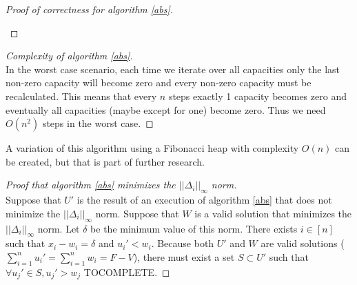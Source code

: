 \documentclass[11pt]{article}
\theoremstyle{definition}
\theoremstyle{corollary}
\theoremstyle{lemma}
\begin{document}
\begin{proof}[Proof of correctness for algorithm \ref{abs}]
\begin{itemize}
\begin{itemize}
          \end{itemize}
       \end{itemize}
    \end{proof}
    \begin{proof}[Complexity of algorithm \ref{abs}] \ \\
       In the worst case scenario, each time we iterate over all capacities only the last non-zero capacity will become zero
       and every non-zero capacity must be recalculated. This means that every $n$ steps exactly 1 capacity becomes zero
       and eventually all capacities (maybe except for one) become zero. Thus we need $O(n^2)$ steps in the worst case.
    \end{proof}
    A variation of this algorithm using a Fibonacci heap with complexity $O(n)$ can be created, but that is part of 
    further research.
    \begin{proof}[Proof that algorithm \ref{abs} minimizes the $||\Delta_i||_\infty$ norm] \ \\
       Suppose that $U'$ is the result of an execution of algorithm \ref{abs} that does not minimize the $||\Delta_i||_\infty$
       norm. Suppose that $W$ is a valid solution that minimizes the $||\Delta_i||_\infty$ norm. Let $\delta$ be the minimum
       value of this norm. There exists $i \in [n]$ such that $x_i - w_i = \delta$ and $u_i' < w_i$. Because both $U'$
       and $W$ are valid solutions ($\sum\limits_{i=1}^{n}u_i' = \sum\limits_{i=1}^{n}w_i = F - V$), there must exist a set
       $S \subset U'$ such that $\forall u_j' \in S, u_j' > w_j$ TOCOMPLETE.
    \end{proof}
\end{document}
